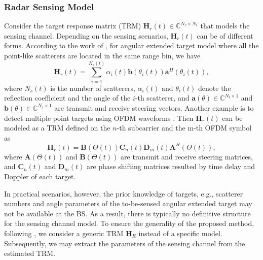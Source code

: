 \documentclass[lettersize,journal]{IEEEtran}
\newcommand{\nocolor}[1]{{\color{black}#1}}
\begin{document}
\subsubsection{Radar Sensing Model}
Consider the target response matrix (TRM) $\mathbf{H}_r(t) \in \mathbb{C}^{N_r \times N_t}$ that models the sensing channel. Depending on the sensing scenarios, $\mathbf{H}_r(t)$ can be of different forms.
According to the work of \cite{li2007mimo}, for angular extended target model where all the point-like scatterers are located in the same range bin, we have
\begin{equation}
    \mathbf{H}_r(t)=\sum_{i=1}^{N_s(t)}\alpha_i(t)\mathbf{b}(\theta_i(t))\mathbf{a}^H(\theta_i(t)),
\end{equation}
where $N_s(t)$ is the number of scatterers, $\alpha_i(t)$ and $\theta_i(t)$ denote the reflection coefficient and the angle of the $i$-th scatterer, and $\mathbf{a}\left(\theta\right) \in \mathbb{C}^{N_t \times 1}$ and $\mathbf{b}\left(\theta\right) \in \mathbb{C}^{N_r \times 1}$ are transmit and receive steering vectors.
Another example is to detect multiple point targets using OFDM waveforms \cite{sen2010multiobjective}. Then $\mathbf{H}_r(t)$ can be modeled as a TRM defined on the $n$-th subcarrier and the m-th OFDM symbol as
\begin{equation}
    \mathbf{H}_r(t)=\mathbf{B}(\Theta(t))\mathbf{C}_n(t)\mathbf{D}_m(t)\mathbf{A}^H(\Theta(t)),
\end{equation}
where $\mathbf{A}(\Theta(t))$ and $\mathbf{B}(\Theta(t))$ are transmit and receive steering matrices, and $\mathbf{C}_n(t)$ and $\mathbf{D}_m(t)$ are phase shifting matrices resulted by time delay and Doppler of each target.

\nocolor{In practical scenarios, however, the prior knowledge of targets, e.g., scatterer numbers and angle parameters of the to-be-sensed angular extended target may not be available at the BS}. As a result, there is typically no definitive structure for the sensing channel model. To ensure the generality of the proposed method, following \cite{liu2022integrated}, we consider a generic TRM $\mathbf{H}_R$ instead of a specific model. Subsequently, we may extract the parameters of the sensing channel from the estimated TRM. 
\end{document}
